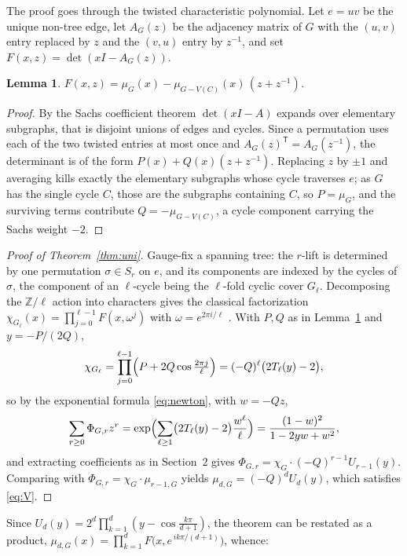 \documentclass[11pt]{article}
\newtheorem{lemma}[theorem]{Lemma}
\theoremstyle{remark}
\begin{document}
The proof goes through the twisted characteristic polynomial. Let $e=uv$ be the
unique non-tree edge, let $A_G(z)$ be the adjacency matrix of $G$ with the
$(u,v)$ entry replaced by $z$ and the $(v,u)$ entry by $z^{-1}$, and set
$F(x,z)=\det(xI-A_G(z))$.

\begin{lemma}\label{lem:PQ}
$F(x,z)=\mu_G(x)-\mu_{G-V(C)}(x)\,(z+z^{-1})$.
\end{lemma}

\begin{proof}
By the Sachs coefficient theorem $\det(xI-A)$ expands over elementary
subgraphs, that is disjoint unions of edges and cycles. Since a permutation
uses each of the two twisted entries at most once and
$A_G(z)^{\mathsf T}=A_G(z^{-1})$, the determinant is of the form
$P(x)+Q(x)(z+z^{-1})$. Replacing $z$ by $\pm1$ and averaging kills exactly the
elementary subgraphs whose cycle traverses $e$; as $G$ has the single cycle $C$,
those are the subgraphs containing $C$, so $P=\mu_G$, and the surviving terms
contribute $Q=-\mu_{G-V(C)}$, a cycle component carrying the Sachs weight $-2$.
\end{proof}

\begin{proof}[Proof of Theorem~\ref{thm:uni}]
Gauge-fix a spanning tree: the $r$-lift is determined by one permutation
$\sigma\in S_r$ on $e$, and its components are indexed by the cycles of
$\sigma$, the component of an $\ell$-cycle being the $\ell$-fold cyclic cover
$G_\ell$. Decomposing the $\mathbb{Z}/\ell$ action into characters gives the
classical factorization $\chi_{G_\ell}(x)=\prod_{j=0}^{\ell-1}F(x,\omega^j)$
with $\omega=e^{2\pi i/\ell}$ \cite{MS,DFMRS}. With $P,Q$ as in
Lemma~\ref{lem:PQ} and $y=-P/(2Q)$,
\[
\chi_{G_\ell}=\prod_{j=0}^{\ell-1}\Bigl(P+2Q\cos\tfrac{2\pi j}{\ell}\Bigr)
=(-Q)^{\ell}\bigl(2T_\ell(y)-2\bigr),
\]
so by the exponential formula \eqref{eq:newton}, with $w=-Qz$,
\[
\sum_{r\ge0}\Phi_{G,r}z^{r}
=\exp\Bigl(\sum_{\ell\ge1}\bigl(2T_\ell(y)-2\bigr)\frac{w^{\ell}}{\ell}\Bigr)
=\frac{(1-w)^2}{1-2yw+w^2},
\]
and extracting coefficients as in Section~2 gives
$\Phi_{G,r}=\chi_G\cdot(-Q)^{r-1}U_{r-1}(y)$. Comparing with
$\Phi_{G,r}=\chi_G\cdot\mu_{r-1,G}$ \cite{HPS} yields
$\mu_{d,G}=(-Q)^{d}U_d(y)$, which satisfies \eqref{eq:V}.
\end{proof}

Since $U_d(y)=2^{d}\prod_{k=1}^{d}(y-\cos\tfrac{k\pi}{d+1})$, the theorem can
be restated as a product,
$\mu_{d,G}(x)=\prod_{k=1}^{d}F\bigl(x,e^{\,ik\pi/(d+1)}\bigr)$, whence:
\end{document}
